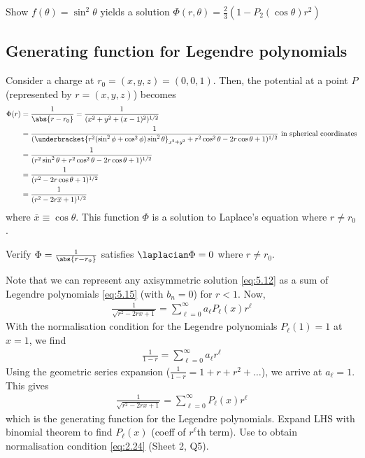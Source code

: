 \begin{exercise}
	Show $f(\theta) = \sin^2 \theta$ yields a solution $\Phi(r, \theta) = \frac{2}{3} (1 - P_2(\cos \theta) r^2)$
\end{exercise} 

\subsection{Generating function for Legendre polynomials}
Consider a charge at $r_0 = (x,y,z) = (0,0,1)$.
Then, the potential at a point $P$ (represented by $r = (x, y, z)$) becomes
\begin{align*}
	\Phi(r) & = \frac{1}{\abs{r - r_0}} = \frac{1}{(x^2 + y^2 + (x-1)^2)^{1/2}} \\
	& = \frac{1}{(\underbracket{r^2 (\sin^2 \phi + \cos^2 \phi) \sin^2 \theta}_{x^2 + y^2} + r^2 \cos^2 \theta - 2r \cos\theta + 1)^{1/2}} \text{ in spherical coordinates}\\
	& = \frac{1}{(r^2 \sin^2 \theta + r^2 \cos^2 \theta - 2r \cos\theta + 1)^{1/2}} \\
	& = \frac{1}{(r^2 - 2r \cos\theta + 1)^{1/2}} \\
	& = \frac{1}{(r^2 - 2r \overline x + 1)^{1/2}}
\end{align*}
where $\overline x \equiv \cos \theta$.
This function $\Phi$ is a solution to Laplace's equation where $r \neq r_0$.

\begin{exercise}
	Verify $\Phi = \frac{1}{\abs{r - r_0}}$ satisfies $\laplacian \Phi = 0$ where $r \neq r_0$.
\end{exercise} 

Note that we can represent any axisymmetric solution \cref{eq:5.12} as a sum of Legendre polynomials \cref{eq:5.15} (with $b_n = 0$) for $r < 1$.
Now,
\begin{align*}
	\frac{1}{\sqrt{r^2 - 2rx + 1}} = \sum_{\ell = 0}^\infty a_\ell P_\ell(x) r^\ell
\end{align*}
With the normalisation condition for the Legendre polynomials $P_\ell(1) = 1$ at $x = 1$, we find
\begin{align*}
	\frac{1}{1-r} = \sum_{\ell=0}^\infty a_\ell r^\ell
\end{align*}
Using the geometric series expansion ($\frac{1}{1-r} = 1 + r + r^2 + \dots$), we arrive at $a_\ell = 1$.
This gives
\begin{align} \label{eq:5.16}
	\frac{1}{\sqrt{r^2 - 2rx + 1}} = \sum_{\ell = 0}^\infty P_\ell(x) r^\ell
\end{align}
which is the generating function for the Legendre polynomials.
Expand LHS with binomial theorem to find $P_\ell(x)$ (coeff of $r^\ell$th term).
Use to obtain normalisation condition \cref{eq:2.24} (Sheet 2, Q5).

